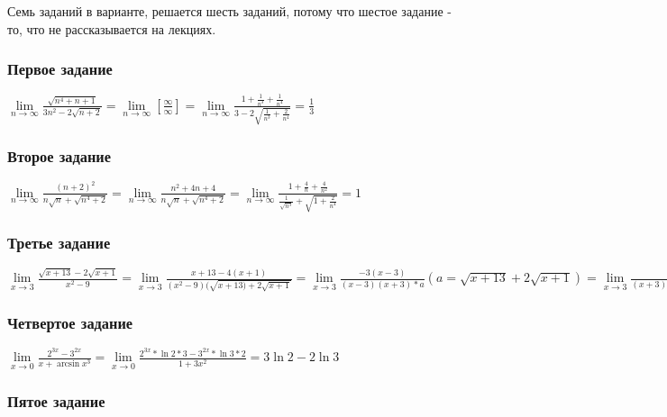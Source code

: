\documentclass{article}
\begin{document}
\begin{flushleft}

Семь заданий в варианте, решается шесть заданий, потому что шестое задание - то, что не рассказывается на лекциях.

\subsubsection{Первое задание}

$
\lim\limits_{n \to \infty} \frac{\sqrt{n^4 + n + 1}}{3n^2 - 2\sqrt{n + 2}}
=
\lim\limits_{n \to \infty} [ \frac{\infty}{\infty} ]
=
\lim\limits_{n \to \infty} \frac{1 + \frac{1}{n^3} + \frac{1}{n^4}}{3 - 2 \sqrt { \frac{1}{n^3} + \frac{2}{n^4}}}
=
\frac{1}{3}
$

\subsubsection{Второе задание}

$
\lim\limits_{n \to \infty} \frac{(n + 2)^2}{n\sqrt{n} + \sqrt{n^4 + 2}}
=
\lim\limits_{n \to \infty} \frac{n^2 + 4n + 4}{n\sqrt{n} + \sqrt{n^4 + 2}}
=
\lim\limits_{n \to \infty} \frac{1 + \frac{4}{n} + \frac{4}{n^2}}{\frac{1}{\sqrt{n^3}} + \sqrt{1 + \frac{2}{n^4}}}
=
1
$

\subsubsection{Третье задание}

$
\lim\limits_{x \to 3} \frac{\sqrt{x + 13} - 2\sqrt{x + 1}}{x^2 - 9}
=
\lim\limits_{x \to 3} \frac{x + 13 - 4(x + 1)}{(x^2 - 9)(\sqrt{x + 13) + 2\sqrt{x + 1}}}
=
\lim\limits_{x \to 3} \frac{-3(x - 3)}{(x-3)(x+3)*a} (a = \sqrt{x+13} + 2\sqrt{x + 1})
=
\lim\limits_{x \to 3} \frac{-3}{(x + 3)(\sqrt{x + 13} + 2\sqrt{x + 1}}
=
-\frac{1}{16}
$

\subsubsection{Четвертое задание}

$
\lim\limits_{x \to 0} \frac{2^{3x} - 3^{2x}}{x + \arcsin x^3}
=
\lim\limits_{x \to 0} \frac{2^{3x} * \ln 2 * 3 - 3^{2x} * \ln 3 * 2}{1 + 3x^2}
=
3\ln 2 - 2\ln 3
$

\subsubsection{Пятое задание}


\end{flushleft}
\end{document}
